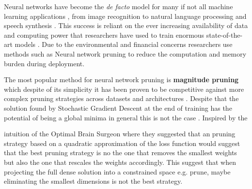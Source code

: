 
    Neural networks have become the \textit{de facto} model for many if not
    all machine learning applications \cite{lecunDeepLearning2015}, from  image
    recognition \cite{tanEfficientNetRethinkingModel2020} to  natural language
    processing \cite{devlinBERTPretrainingDeep2019} and  
    speech synthesis \cite{oordWaveNetGenerativeModel2016}. This success is
    reliant on the ever increasing availability of data and computing power
    that researchers have used to train enormous state-of-the-art models
    \cite{brownLanguageModelsAre2020}. Due to the environmental and financial
    concerns \cite{thompsonComputationalLimitsDeep2020} researchers use methods
    such as Neural network pruning to reduce the computation and memory burden
    during deployment.

    The most popular method for neural network pruning is \textbf{magnitude
    pruning}  which despite of its simplicity  it has been proven to be competitive against more complex pruning
    strategies across datasets and architectures
    \cite{guptaComplexityRequiredNeural2022}. Despite that the solution found
    by Stochastic Gradient Descent at the end of training has the potential of
    being a global minima \cite{leeGradientDescentOnly2016,luDepthCreatesNo2017,
    zhouSGDConvergesGlobal2018,kawaguchiDeepLearningPoor2016} in general this
    is not the case \cite{dingSubOptimalLocalMinima2020}. Inspired by
    the





intuition of the Optimal
Brain Surgeon \cite{hassibiSecondOrderDerivatives1992}
    where they suggested that an pruning strategy based on a quadratic
    approximation of the loss function would suggest that the best pruning
    strategy is no the one that removes the smallest weights but also the one
    that rescales the weights accordingly. This
    suggest that when projecting the full dense solution into a constrained
    space e.g. prune, maybe eliminating the smallest dimensions is not
    the best strategy.


